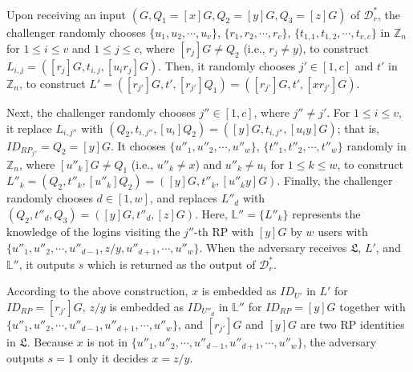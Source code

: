 %

Upon receiving an input $(G, Q_1=[x]G, Q_2=[y]G, Q_3=[z]G)$ of $\mathcal{D}^*_r$,
 the challenger randomly chooses
 $\{u_1, u_2, \cdots, u_v\}$, $\{r_1, r_2, \cdots, r_c\}$, $\{t_{1, 1}, t_{1, 2}, \cdots, t_{v, c}\}$ in $\mathbb{Z}_n$ for $1 \le i \le v$ and $1 \le j \le c$,
  where $[r_{j}]G \neq Q_2$ (i.e., $r_j \neq y$),
  to construct $L_{i, j}=([r_j]G, t_{i,j}, [u_ir_j]G)$.
Then,
 it randomly chooses $j' \in [1, c]$ and $t'$ in $\mathbb{Z}_n$, to construct $L' = ([r_{j'}]G, t', [r_{j'}]Q_1) = ([r_{j'}]G, t', [xr_{j'}]G)$.

Next, the challenger randomly chooses $j'' \in [1, c]$, where $j'' \neq j'$.
For $1 \leq i \leq v$, it replace $L_{i, j''}$ with $(Q_2, t_{i,j''}, [u_i]Q_2) = ([y]G, t_{i,j''}, [u_iy]G)$;
that is, $ID_{RP_{j''}} = Q_2 = [y]G$.
It chooses $\{u''_1, u''_2, \cdots, u''_w\}$, $\{t''_1, t''_2, \cdots, t''_w\}$ randomly in $\mathbb{Z}_n$,
    where $[u''_k]G \neq Q_1$ (i.e., $u''_k \neq x$) and $u''_k \neq u_i$ for $1 \leq k \leq w$,
    to construct $L''_k = (Q_2, t''_k, [u''_k]Q_2) = ([y]G, t''_k, [u''_ky]G)$.
Finally,
the challenger randomly chooses $d \in [1, w]$, and replaces $L''_d$ with $(Q_2, t''_d, Q_3) = ([y]G, t''_d, [z]G)$.
Here, $\mathbb{L}'' = \{L''_k\}$ represents the knowledge of the logins
        visiting the $j''$-th RP with $[y]G$ by
    $w$ users with $\{u''_1, u''_2, \cdots, u''_{d-1}, z/y, u''_{d+1}, \cdots, u''_w\}$.
When the adversary receives $\mathfrak{L}$, $L'$, and $\mathbb{L}''$,
 it outputs $s$ which is returned as the output of $\mathcal{D}^*_r$.

According to the above construction, %
 $x$ is embedded as $ID_{U'}$ in $L'$ for $ID_{RP} = [r_{j'}]G$,
 $z/y$ is embedded as $ID_{U''_d}$ in $\mathbb{L}''$ for $ID_{RP} = [y]G$ together with $\{u''_1, u''_2, \cdots, u''_{d-1}, u''_{d+1}, \cdots, u''_w\}$, and $[r_{j'}]G$ and $[y]G$ are two RP identities in $\mathfrak{L}$.
Because $x$ is not in $\{u''_1, u''_2, \cdots, u''_{d-1}, u''_{d+1}, \cdots, u''_w\}$,
    the adversary outputs $s=1$ only it decides $x = z/y$.

